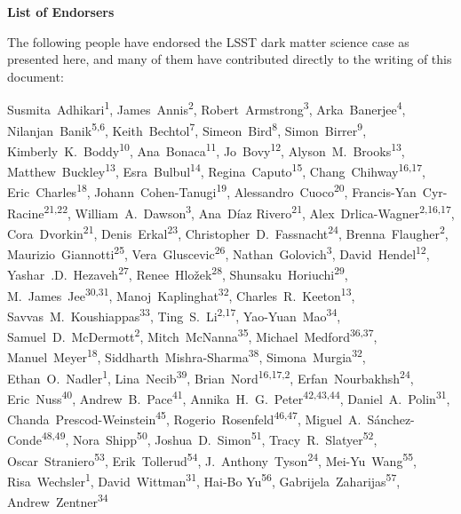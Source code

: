 
\begin{center}
  {\Large \bf List of Endorsers}
\end{center}
\bigskip

The following people have endorsed the LSST dark matter science case as presented here, and many of them have contributed directly to the writing of this document:

\def\altaffilmark#1{\textsuperscript{#1}}
\def\affil#1{\noindent #1 \\}

\normalsize
\begin{raggedright}

Susmita~Adhikari\altaffilmark{1},
James~Annis\altaffilmark{2},
Robert~Armstrong\altaffilmark{3},
Arka~Banerjee\altaffilmark{4},
Nilanjan~Banik\altaffilmark{5,6},
Keith~Bechtol\altaffilmark{7},
Simeon~Bird\altaffilmark{8},
Simon~Birrer\altaffilmark{9},
Kimberly~K.~Boddy\altaffilmark{10},
Ana~Bonaca\altaffilmark{11},
Jo~Bovy\altaffilmark{12},
Alyson~M.~Brooks\altaffilmark{13},
Matthew~Buckley\altaffilmark{13},
Esra~Bulbul\altaffilmark{14},
Regina~Caputo\altaffilmark{15},
Chang~Chihway\altaffilmark{16,17},
Eric~Charles\altaffilmark{18},
Johann~Cohen-Tanugi\altaffilmark{19},
Alessandro~Cuoco\altaffilmark{20},
Francis-Yan~Cyr-Racine\altaffilmark{21,22},
William~A.~Dawson\altaffilmark{3},
Ana~D\'{i}az Rivero\altaffilmark{21},
Alex~Drlica-Wagner\altaffilmark{2,16,17},
Cora~Dvorkin\altaffilmark{21},
Denis~Erkal\altaffilmark{23},
Christopher~D.~Fassnacht\altaffilmark{24},
Brenna~Flaugher\altaffilmark{2},
Maurizio~Giannotti\altaffilmark{25},
Vera~Gluscevic\altaffilmark{26},
Nathan~Golovich\altaffilmark{3},
David~Hendel\altaffilmark{12},
Yashar~.D.~Hezaveh\altaffilmark{27},
Renee~Hlo\v{z}ek\altaffilmark{28},
Shunsaku~Horiuchi\altaffilmark{29},
M.~James~Jee\altaffilmark{30,31},
Manoj~Kaplinghat\altaffilmark{32},
Charles~R.~Keeton\altaffilmark{13},
Savvas~M.~Koushiappas\altaffilmark{33},
Ting~S.~Li\altaffilmark{2,17},
Yao-Yuan~Mao\altaffilmark{34},
Samuel~D.~McDermott\altaffilmark{2},
Mitch~McNanna\altaffilmark{35},
Michael~Medford\altaffilmark{36,37},
Manuel~Meyer\altaffilmark{18},
Siddharth~Mishra-Sharma\altaffilmark{38},
Simona~Murgia\altaffilmark{32},
Ethan~O.~Nadler\altaffilmark{1},
Lina~Necib\altaffilmark{39},
Brian~Nord\altaffilmark{16,17,2},
Erfan~Nourbakhsh\altaffilmark{24},
Eric~Nuss\altaffilmark{40},
Andrew~B.~Pace\altaffilmark{41},
Annika~H.~G.~Peter\altaffilmark{42,43,44},
Daniel~A.~Polin\altaffilmark{31},
Chanda~Prescod-Weinstein\altaffilmark{45},
Rogerio~Rosenfeld\altaffilmark{46,47},
Miguel~A.~S\'anchez-Conde\altaffilmark{48,49},
Nora~Shipp\altaffilmark{50},
Joshua~D.~Simon\altaffilmark{51},
Tracy~R.~Slatyer\altaffilmark{52},
Oscar~Straniero\altaffilmark{53},
Erik~Tollerud\altaffilmark{54},
J.~Anthony~Tyson\altaffilmark{24},
Mei-Yu~Wang\altaffilmark{55},
Risa~Wechsler\altaffilmark{1},
David~Wittman\altaffilmark{31},
Hai-Bo Yu\altaffilmark{56},
Gabrijela~Zaharijas\altaffilmark{57},
Andrew~Zentner\altaffilmark{34}


\end{raggedright}

